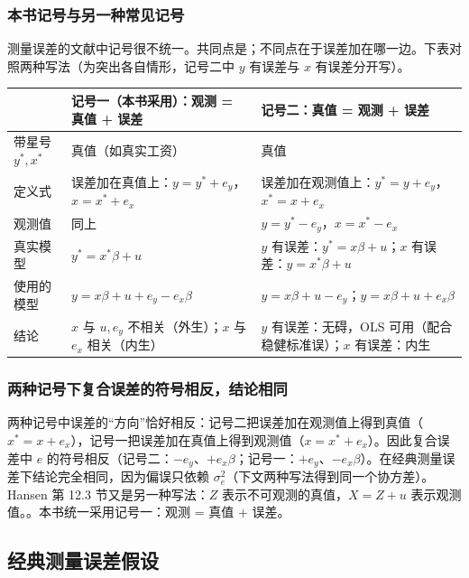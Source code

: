 \subsubsection{本书记号与另一种常见记号}

测量误差的文献中记号很不统一。共同点是；不同点在于误差加在哪一边。下表对照两种写法（为突出各自情形，记号二中 $y$ 有误差与 $x$ 有误差分开写）。

\begin{center}
\small
\begin{tabularx}{\linewidth}{lLL}
\toprule
 & 记号一（本书采用）：观测 = 真值 + 误差 & 记号二：真值 = 观测 + 误差\\
\midrule
带星号 $y^*,x^*$ & 真值（如真实工资） & 真值\\
定义式 & 误差加在真值上：$y=y^*+e_y$，$x=x^*+e_x$ & 误差加在观测值上：$y^*=y+e_y$，$x^*=x+e_x$\\
观测值 & 同上 & $y=y^*-e_y$，$x=x^*-e_x$\\
真实模型 & $y^*=x^*\beta+u$ & $y$ 有误差：$y^*=x\beta+u$；$x$ 有误差：$y=x^*\beta+u$\\
使用的模型 & $y=x\beta+u+e_y-e_x\beta$ & $y=x\beta+u-e_y$；$y=x\beta+u+e_x\beta$\\
结论 & $x$ 与 $u,e_y$ 不相关（外生）；$x$ 与 $e_x$ 相关（内生） & $y$ 有误差：无碍，OLS 可用（配合稳健标准误）；$x$ 有误差：内生\\
\bottomrule
\end{tabularx}
\end{center}

\subsubsection{两种记号下复合误差的符号相反，结论相同}

\begin{note}[记号的差异与陷阱]
两种记号中误差的“方向”恰好相反：记号二把误差加在观测值上得到真值（$x^*=x+e_x$），记号一把误差加在真值上得到观测值（$x=x^*+e_x$）。因此复合误差中 $e$ 的符号相反（记号二：$-e_y$、$+e_x\beta$；记号一：$+e_y$、$-e_x\beta$）。在经典测量误差下结论完全相同，因为偏误只依赖 $\sigma_e^2$（下文两种写法得到同一个协方差）。Hansen 第 12.3 节又是另一种写法：$Z$ 表示不可观测的真值，$X=Z+u$ 表示观测值。。本书统一采用记号一：观测 = 真值 + 误差。
\end{note}

\subsection{经典测量误差假设}

